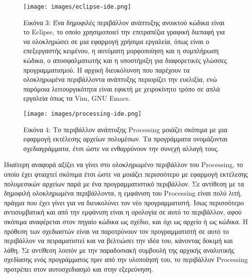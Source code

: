 \documentclass[
]{article}
\begin{document}
\leavevmode{}%
\begin{figure}
\hypertarget{fig:eclipse-ide}{%
\centering
\texttt{[image: images/eclipse-ide.png]}
\caption{Εικόνα 3: Ένα δημοφιλές περιβάλλον ανάπτυξης ανοικτού κώδικα
είναι το Eclipse, το οποίο χρησιμοποιεί την επιτραπέζια γραφική διεπαφή
για να ολοκληρώσει σε μια εφαρμογή χρήσιμα εργαλεία, όπως είναι ο
επεξεργαστής κειμένου, η αυτόματη μορφοποίηση και η συμπλήρωση κώδικα, ο
αποσφαλματωτής και η υποστήριξη για διαφορετικές γλώσσες
προγραμματισμού. Η αρχική διευκόλυνση που παρέχουν τα ολοκληρωμένα
περιβάλλοντα ανάπτυξης περιορίζει την ευελιξία, ενώ παρόμοια
λειτουργικότητα είναι εφικτή με χειροκίνητο τρόπο σε απλά εργαλεία όπως
τα Vim, GNU Emacs.}\label{fig:eclipse-ide}
}
\end{figure}

\leavevmode{}%
\begin{figure}
\hypertarget{fig:processing-ide}{%
\centering
\texttt{[image: images/processing-ide.png]}
\caption{Εικόνα 4: Το περιβάλλον ανάπτυξης Processing μοιάζει σκόπιμα με
μια εφαρμογή εκτέλεσης αρχείων πολυμέσων. Τα προγράμματα ονομάζονται
σχεδιαγράμματα, έτσι ώστε να ενθαρρύνουν την συνεχή αλλαγή
τους.}\label{fig:processing-ide}
}
\end{figure}

Ιδιαίτερη αναφορά αξίζει να γίνει στο ολοκληρωμένο περιβάλλον του
Processing, το οποίο έχει φτιαχτεί σκόπιμα έτσι ώστε να μοιάζει
περισσότερο με εφαρμογή εκτέλεσης πολυμεσικών αρχείων παρά με ένα
προγραμματιστικό περιβάλλον. Σε αντίθεση με τα δημοφιλή ολοκληρωμένα
περιβάλλοντα, η εμφάνιση του Processing είναι πολύ λιτή, πράγμα που έχει
γίνει για να διευκολύνει τον νέο προγραμματιστή. Ίσως περισσότερο
αντισυμβατική και από την εμφάνιση είναι η ορολογία σε αυτό το
περιβάλλον, αφού σκόπιμα αναφέρεται στον πηγαίο κώδικα ως σχέδιο, και
όχι ως αρχείο ή ως κώδικα. Η πρόθεση των σχεδιαστών είναι να παροτρύνουν
τον προγραμματιστή σε αυτό το περιβάλλον να πειραματιστεί και να
βελτιώσει την ιδέα του, κάνοντας δοκιμή και λάθη. Σε αντίθεση λοιπόν με
την παραδοσιακή συμβουλή της αρχικής αναλυτικής σχεδίασης ενός
προγράμματος πριν από την υλοποίησή του, το περιβάλλον Processing
προτρέπει στον αυτοσχεδιασμό και στην εξερεύνηση.
\end{document}
